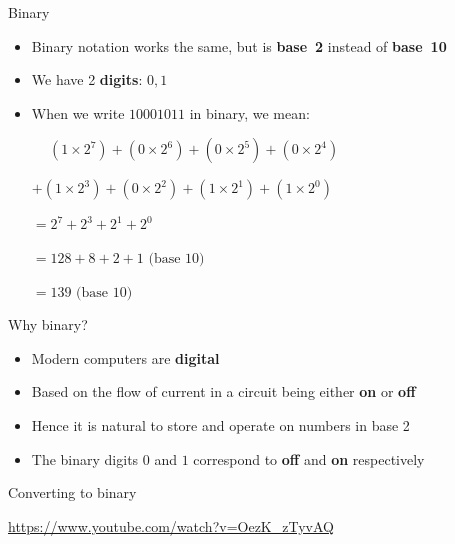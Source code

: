 \begin{frame}{Binary}
	\begin{itemize}
		\pause\item Binary notation works the same, but is \textbf{base~2} instead of \textbf{base~10}
		\pause\item We have 2 \textbf{digits}: $0, 1$
		\pause\item When we write $10001011$ in binary, we mean: \par\pause
			$\phantom{+} \left(1 \times 2^7\right) + 
			\left(0 \times 2^6\right) + 
			\left(0 \times 2^5\right) + 
			\left(0 \times 2^4\right)$ \par
			$+ \left(1 \times 2^3\right) + 
			\left(0 \times 2^2\right) + 
			\left(1 \times 2^1\right) + 
			\left(1 \times 2^0\right)$ \par\pause
			$= 2^7 + 2^3 + 2^1 + 2^0$ \par\pause
			$= 128 + 8 + 2 + 1 \text{ (base 10)}$ \par\pause
			$= 139 \text{ (base 10)}$
	\end{itemize}
\end{frame}

\begin{frame}{Why binary?}
	\begin{itemize}
		\pause\item Modern computers are \textbf{digital}
		\pause\item Based on the flow of current in a circuit being either \textbf{on} or \textbf{off}
		\pause\item Hence it is natural to store and operate on numbers in base 2
		\pause\item The binary digits $0$ and $1$ correspond to \textbf{off} and \textbf{on} respectively
	\end{itemize}
\end{frame}

\begin{frame}{Converting to binary}
    \begin{center}
        \url{https://www.youtube.com/watch?v=OezK_zTyvAQ}
    \end{center}
\end{frame}

